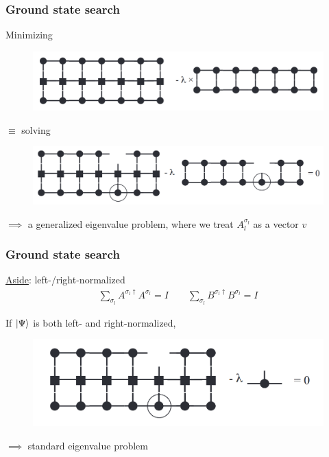 \documentclass{beamer}
\theoremstyle{definition}
\begin{document}
\begin{frame}
	\frametitle{Ground state search}
	Minimizing
	\begin{figure}[!htb]
		\centering
		\includegraphics[scale=0.25]{gnd_state_search.png}
	\end{figure}
	$\equiv$ solving
	\begin{figure}[!htb]
		\centering
		\includegraphics[scale=0.25]{gnd_state_search1.png}
	\end{figure}
	$\implies$ a generalized eigenvalue problem, where we treat $A^{\sigma_l}_l$ as a vector $v$
\end{frame}

\begin{frame}
	\frametitle{Ground state search}
	
	\underline{Aside}: left-/right-normalized
	\begin{align*}
		\sum_{\sigma_l} A^{\sigma_l\dagger} A^{\sigma_l} = I \quad\quad \sum_{\sigma_l} B^{\sigma_l\dagger} B^{\sigma_l} = I
	\end{align*}
	
	If $\ket{\Psi}$ is both left- and right-normalized,
	\begin{figure}[!htb]
		\centering
		\includegraphics[scale=0.25]{gnd_state_search2.png}
\end{figure}
	$\implies$ standard eigenvalue problem 
\end{frame}
\end{document}
